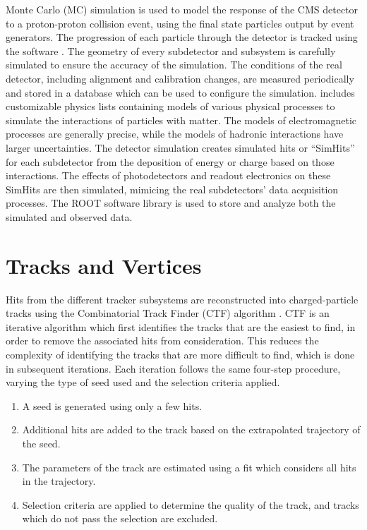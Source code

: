 Monte Carlo (MC) simulation is used to model the response of the CMS detector to a proton-proton collision event, using the final state particles output by event generators. The progression of each particle through the detector is tracked using the \GEANTfour software \cite{geant4nim,geant4ieee}. The geometry of every subdetector and subsystem is carefully simulated to ensure the accuracy of the simulation. The conditions of the real detector, including alignment and calibration changes, are measured periodically and stored in a database which can be used to configure the simulation. \GEANTfour includes customizable physics lists containing models of various physical processes to simulate the interactions of particles with matter. The models of electromagnetic processes are generally precise, while the models of hadronic interactions have larger uncertainties. The detector simulation creates simulated hits or ``SimHits'' for each subdetector from the deposition of energy or charge based on those interactions. The effects of photodetectors and readout electronics on these SimHits are then simulated, mimicing the real subdetectors' data acquisition processes. The ROOT software library \cite{Brun199781} is used to store and analyze both the simulated and observed data.

\section{Tracks and Vertices
\label{sec:tracks}}

Hits from the different tracker subsystems are reconstructed into charged-particle tracks using the Combinatorial Track Finder (CTF) algorithm \cite{TrackingJINST}. CTF is an iterative algorithm which first identifies the tracks that are the easiest to find, in order to remove the associated hits from consideration. This reduces the complexity of identifying the tracks that are more difficult to find, which is done in subsequent iterations. Each iteration follows the same four-step procedure, varying the type of seed used and the selection criteria applied.
\begin{enumerate}
\item A seed is generated using only a few hits.
\item Additional hits are added to the track based on the extrapolated trajectory of the seed.
\item The parameters of the track are estimated using a fit which considers all hits in the trajectory.
\item Selection criteria are applied to determine the quality of the track, and tracks which do not pass the selection are excluded.
\end{enumerate}

